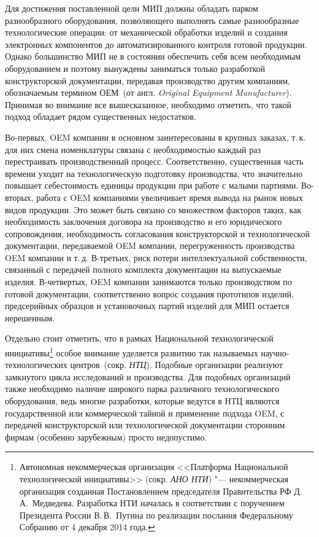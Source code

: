 Для достижения поставленной цели МИП должны обладать парком разнообразного оборудования, позволяющего выполнять самые разнообразные технологические операции: от механической обработки изделий и создания электронных компонентов до автоматизированного контроля готовой продукции. Однако большинство МИП не в состоянии обеспечить себя всем необходимым оборудованием и поэтому вынуждены заниматься только разработкой конструкторской документации, передавая производство другим компаниям, обозначаемым термином ОЕМ~(от англ. \textit{Original Equipment Manufacturer}). Принимая во внимание все вышесказанное, необходимо отметить, что такой подход обладает рядом существенных недостатков.

Во-первых, OEM компании в основном заинтересованы в крупных заказах, т.\,к. для них смена номенклатуры связана с необходимостью каждый раз перестраивать производственный процесс. Соответственно, существенная часть времени уходит на технологическую подготовку производства, что значительно повышает себестоимость единицы продукции при работе с малыми партиями. Во-вторых, работа с OEM компаниями увеличивает время вывода на рынок новых видов продукции. Это может быть связано со множеством факторов таких, как необходимость заключения договора на производство и его юридического сопровождения, необходимость согласования конструкторской и технологической документации, передаваемой OEM компании, перегруженность производства OEM компании и т.\,д. В-третьих, риск потери интеллектуальной собственности, связанный с передачей полного комплекта документации на выпускаемые изделия. В-четвертых, OEM компании занимаются только производством по готовой документации, соответственно вопрос создания прототипов изделий, предсерийных образцов и установочных партий изделий для МИП остается нерешенным.

Отдельно стоит отметить, что в рамках Национальной технологической инициативы\footnote{Автономная некоммерческая организация <<Платформа Национальной технологической инициативы>> (сокр. \textit{АНО НТИ}) "--- некоммерческая организация созданная Постановлением председателя Правительства РФ Д.\,А.~Медведева. Разработка НТИ началась в соответствии с поручением Президента России В.\,В.~Путина по реализации послания Федеральному Собранию от 4 декабря 2014 года.} особое внимание уделяется развитию так называемых научно-технологических центров~(сокр. \textit{НТЦ}). Подобные организации реализуют замкнутого цикла исследований и производства. Для подобных организаций также необходимо наличие широкого парка различного технологического оборудования, ведь многие разработки, которые ведутся в НТЦ являются государственной или коммерческой тайной и применение подхода OEM, с передачей конструкторской или технологической документации сторонним фирмам (особенно зарубежным) просто недопустимо.  

